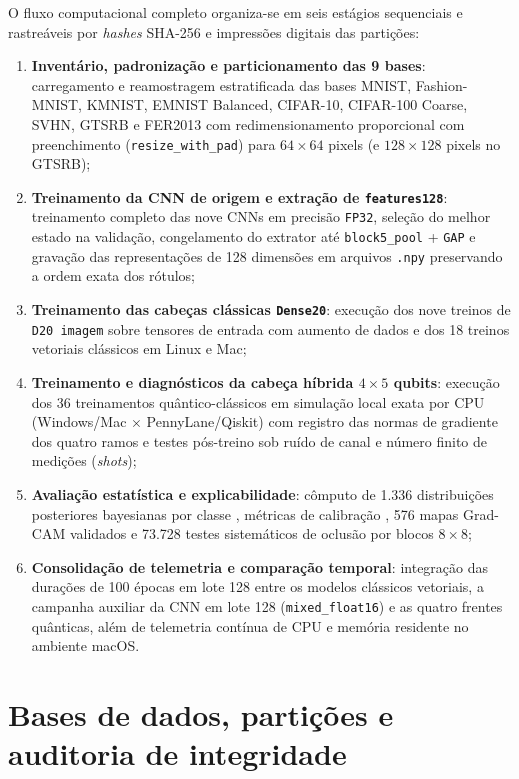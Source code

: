 \documentclass[
    12pt,
    openright,
    oneside,
    a4paper,
    english,
    brazil
]{abntex2}
\begin{document}
O fluxo computacional completo organiza-se em seis estágios sequenciais e rastreáveis por \textit{hashes} SHA-256 e impressões digitais das partições:
\begin{enumerate}
    \item \textbf{Inventário, padronização e particionamento das 9 bases}: carregamento e reamostragem estratificada das bases MNIST, Fashion-MNIST, KMNIST, EMNIST Balanced, CIFAR-10, CIFAR-100 Coarse, SVHN, GTSRB e FER2013 com redimensionamento proporcional com preenchimento (\texttt{resize\_with\_pad}) para \(64 \times 64\) pixels (e \(128 \times 128\) pixels no GTSRB);
    \item \textbf{Treinamento da CNN de origem e extração de \texttt{features128}}: treinamento completo das nove CNNs em precisão \texttt{FP32}, seleção do melhor estado na validação, congelamento do extrator até \texttt{block5\_pool} + \texttt{GAP} e gravação das representações de 128 dimensões em arquivos \texttt{.npy} preservando a ordem exata dos rótulos;
    \item \textbf{Treinamento das cabeças clássicas \texttt{Dense20}}: execução dos nove treinos de \texttt{D20 imagem} sobre tensores de entrada com aumento de dados e dos 18 treinos vetoriais clássicos em Linux e Mac;
    \item \textbf{Treinamento e diagnósticos da cabeça híbrida \(4 \times 5\) qubits}: execução dos 36 treinamentos quântico-clássicos em simulação local exata por CPU (Windows/Mac \(\times\) PennyLane/Qiskit) com registro das normas de gradiente dos quatro ramos e testes pós-treino sob ruído de canal e número finito de medições (\textit{shots});
    \item \textbf{Avaliação estatística e explicabilidade}: cômputo de 1.336 distribuições posteriores bayesianas por classe \cite{wang2019bayestest}, métricas de calibração \cite{guo2017calibration}, 576 mapas Grad-CAM validados e 73.728 testes sistemáticos de oclusão por blocos \(8 \times 8\);
    \item \textbf{Consolidação de telemetria e comparação temporal}: integração das durações de 100 épocas em lote 128 entre os modelos clássicos vetoriais, a campanha auxiliar da CNN em lote 128 (\texttt{mixed\_float16}) e as quatro frentes quânticas, além de telemetria contínua de CPU e memória residente no ambiente macOS.
\end{enumerate}

\section{Bases de dados, partições e auditoria de integridade}
\label{sec:bases_particoes}
\end{document}
